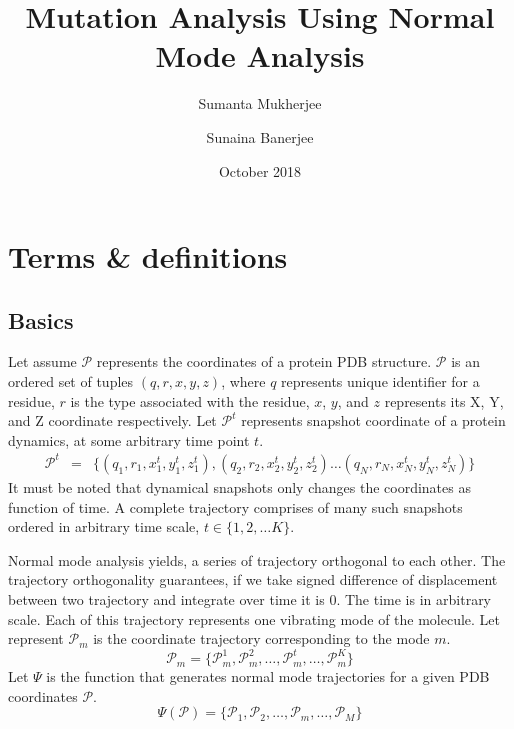 \documentclass{article}
\title{Mutation Analysis Using Normal Mode Analysis }
\author{{Sumanta Mukherjee} \and {Sunaina Banerjee}}
\date{October 2018}
\begin{document}
\maketitle

\section{Terms \& definitions }
\subsection{Basics}
Let assume $\mathscr{P}$ represents the coordinates of a protein PDB structure. $\mathscr{P}$ is an ordered set of tuples $(q, r, x, y, z)$, where $q$ represents unique identifier for a residue, $r$ is the type associated with the residue, $x$, $y$, and $z$ represents its X, Y, and Z coordinate respectively. Let $\mathscr{P}^{t}$ represents snapshot coordinate of a protein dynamics, at some arbitrary time point $t$. 
\begin{eqnarray*}
  \mathscr{P}^{t} & = & \Big\lbrace (q_{1},r_{1},x^{t}_{1},y^{t}_{1},z^{t}_{1}), (q_{2},r_{2},x^{t}_{2},y^{t}_{2},z^{t}_{2}) \dots (q_{N},r_{N},x^{t}_{N},y^{t}_{N},z^{t}_{N}) \Big\rbrace
\end{eqnarray*}
 It must be noted that dynamical snapshots only changes the coordinates as function of time. A complete trajectory comprises of many such snapshots ordered in arbitrary time scale, $t \in \lbrace 1, 2, \dots K \rbrace$.
 \par
 Normal mode analysis yields, a series of trajectory orthogonal to each other. The trajectory orthogonality guarantees, if we take signed difference of displacement between two trajectory and integrate over time it is $0$. The time is in arbitrary scale. Each of this trajectory represents one vibrating mode of the molecule. Let represent $\mathbf{\mathscr{P}}_{m}$ is the coordinate trajectory corresponding to the mode $m$. 
\begin{equation*}
    \mathscr{P}_{m} = \Big\lbrace \mathscr{P}^{1}_{m}, \mathscr{P}^{2}_{m}, \dots ,\mathscr{P}^{t}_{m}, \dots , \mathscr{P}^{K}_{m} \Big\rbrace
\end{equation*}
 Let $\Psi$ is the function that generates normal mode trajectories for a given PDB coordinates $\mathscr{P}$.
 \begin{equation*}
     \Psi(\mathscr{P}) = \Big\lbrace \mathscr{P}_{1} , \mathscr{P}_{2}, \dots , \mathscr{P}_{m}, \dots ,\mathscr{P}_{M} \Big\rbrace
 \end{equation*}
 
\end{document}

